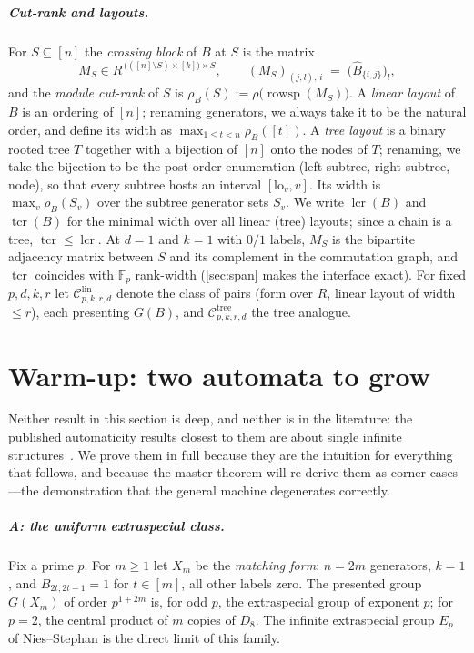\documentclass[a4paper,UKenglish,autoref,anonymous]{lipics-v2021}
\newcommand{\Fp}{\mathbb{F}_p}
\newcommand{\R}{R}                                   %
\newcommand{\rs}{\operatorname{rowsp}}
\newcommand{\mrk}{\rho}                              %
\newcommand{\lcr}{\operatorname{lcr}}
\newcommand{\tcr}{\operatorname{tcr}}
\newcommand{\lin}[1]{\mathcal{C}^{\mathrm{lin}}_{#1}}
\newcommand{\tre}[1]{\mathcal{C}^{\mathrm{tree}}_{#1}}
\begin{document}
\subparagraph*{Cut-rank and layouts.}
For $S \subseteq [n]$ the \emph{crossing block} of $B$ at $S$ is the
matrix
\[
  M_S \in \R^{\,\bigl(([n] \setminus S) \times [k]\bigr) \times S},
  \qquad
  (M_S)_{(j,l),\,i} \;=\; \bigl(\hat B_{\{i,j\}}\bigr)_l ,
\]
and the \emph{module cut-rank} of $S$ is $\rho_B(S) :=
\mrk\bigl(\rs(M_S)\bigr)$. A \emph{linear layout} of $B$ is an ordering
of $[n]$; renaming generators, we always take it to be the natural
order, and define its width as $\max_{1 \le t < n} \rho_B([t])$. A
\emph{tree layout} is a binary rooted tree $T$ together with a bijection
of $[n]$ onto the nodes of $T$; renaming, we take the bijection to be
the post-order enumeration (left subtree, right subtree, node), so that
every subtree hosts an interval $[\mathrm{lo}_v, v]$. Its width is
$\max_v \rho_B(S_v)$ over the subtree generator sets $S_v$. We write
$\lcr(B)$ and $\tcr(B)$ for the minimal width over all linear (tree)
layouts; since a chain is a tree, $\tcr \le \lcr$. At $d = 1$ and $k =
1$ with $0/1$ labels, $M_S$ is the bipartite adjacency matrix between
$S$ and its complement in the commutation graph, and $\tcr$ coincides
with $\Fp$ rank-width (\autoref{sec:span} makes the interface exact).
For fixed $p, d, k, r$ let $\lin{p,k,r,d}$ denote the class of pairs
(form over $\R$, linear layout of width $\le r$), each presenting
$G(B)$, and $\tre{p,k,r,d}$ the tree analogue.

\section{Warm-up: two automata to grow}
\label{sec:warmup}

Neither result in this section is deep, and neither is in the literature:
the published automaticity results closest to them are about single
infinite structures~\cite{NiesStephan2023}. We prove them in full because
they are the intuition for everything that follows, and because the
master theorem will re-derive them as corner cases---the demonstration
that the general machine degenerates correctly.

\subparagraph*{A: the uniform extraspecial class.}
Fix a prime $p$. For $m \ge 1$ let $X_m$ be the \emph{matching form}: $n =
2m$ generators, $k = 1$, and $B_{2t,2t-1} = 1$ for $t \in [m]$, all other
labels zero. The presented group $G(X_m)$ of order $p^{1+2m}$ is, for odd
$p$, the extraspecial group of exponent $p$; for $p = 2$, the central
product of $m$ copies of $D_8$. The infinite extraspecial group $E_p$ of
Nies--Stephan is the direct limit of this family.
\end{document}

